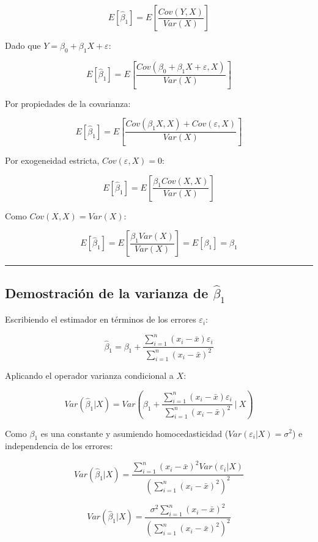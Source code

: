 \documentclass[
]{book}
\begin{document}
\[
E[\hat{\beta}_1] = E\left[\frac{Cov(Y,X)}{Var(X)}\right]
\]

Dado que \(Y = \beta_0 + \beta_1X + \varepsilon\):

\[
E[\hat{\beta}_1] = E\left[\frac{Cov(\beta_0 + \beta_1X + \varepsilon, X)}{Var(X)}\right]
\]

Por propiedades de la covarianza:

\[
E[\hat{\beta}_1] = E\left[\frac{Cov(\beta_1X, X) + Cov(\varepsilon, X)}{Var(X)}\right]
\]

Por exogeneidad estricta, \(Cov(\varepsilon, X) = 0\):

\[
E[\hat{\beta}_1] = E\left[\frac{\beta_1 Cov(X, X)}{Var(X)}\right]
\]

Como \(Cov(X, X) = Var(X)\):

\[
E[\hat{\beta}_1] = E\left[\frac{\beta_1 Var(X)}{Var(X)}\right] = E[\beta_1] = \beta_1
\]

\begin{center}\rule{0.5\linewidth}{0.5pt}\end{center}

\subsection{\texorpdfstring{Demostración de la varianza de \(\hat{\beta}_1\)}{Demostración de la varianza de \textbackslash hat\{\textbackslash beta\}\_1}}\label{demostraciuxf3n-de-la-varianza-de-hatbeta_1}

Escribiendo el estimador en términos de los errores \(\varepsilon_i\):

\[
\hat{\beta}_1 = \beta_1 + \frac{\sum_{i=1}^{n}(x_i - \bar{x})\varepsilon_i}{\sum_{i=1}^{n}(x_i - \bar{x})^2}
\]

Aplicando el operador varianza condicional a \(X\):

\[
Var(\hat{\beta}_1 | X) = Var\left( \beta_1 + \frac{\sum_{i=1}^{n}(x_i - \bar{x})\varepsilon_i}{\sum_{i=1}^{n}(x_i - \bar{x})^2} \ \Bigg|\  X \right)
\]

Como \(\beta_1\) es una constante y asumiendo homocedasticidad (\(Var(\varepsilon_i|X) = \sigma^2\)) e independencia de los errores:

\[
Var(\hat{\beta}_1 | X) = \frac{\sum_{i=1}^{n}(x_i - \bar{x})^2 Var(\varepsilon_i | X)}{\left(\sum_{i=1}^{n}(x_i - \bar{x})^2\right)^2}
\]

\[
Var(\hat{\beta}_1 | X) = \frac{\sigma^2 \sum_{i=1}^{n}(x_i - \bar{x})^2}{\left(\sum_{i=1}^{n}(x_i - \bar{x})^2\right)^2}
\]
\end{document}
